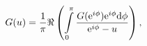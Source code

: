 \begin{equation}
G(u) = \frac{1}{\pi} \Re \left( 
\int\limits_{0}^{\pi} \frac{G({\rm e}^{i \phi})
{\rm e}^{i \phi} {\rm d} \phi}
{{\rm e}^{i \phi} - u}
\right), 
\end{equation}

